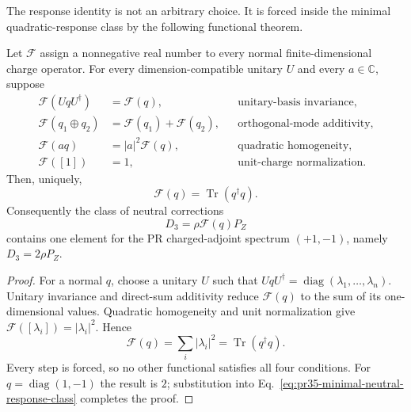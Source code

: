 The response identity is not an arbitrary choice.  It is forced inside the minimal quadratic-response class by the following functional theorem.

\begin{theorem}
\label{thm:pr35-unique-quadratic-response}
Let $\mathcal F$ assign a nonnegative real number to every normal finite-dimensional charge operator.  For every dimension-compatible unitary $U$ and every $a\in\mathbb C$, suppose
\begin{align}
 \mathcal F(UqU^\dagger)&=\mathcal F(q),
 &&\text{unitary-basis invariance},\nonumber\\
 \mathcal F(q_1\oplus q_2)&=\mathcal F(q_1)+\mathcal F(q_2),
 &&\text{orthogonal-mode additivity},\nonumber\\
 \mathcal F(aq)&=|a|^2\mathcal F(q),
 &&\text{quadratic homogeneity},\nonumber\\
 \mathcal F([1])&=1,
 &&\text{unit-charge normalization}.
 \label{eq:pr35-canonical-response-axioms}
\end{align}
Then, uniquely,
\begin{equation}
 \mathcal F(q)=\operatorname{Tr}(q^\dagger q).
 \label{eq:pr35-unique-response-functional}
\end{equation}
Consequently the class of neutral corrections
\begin{equation}
 D_3=\rho\mathcal F(q)P_Z
 \label{eq:pr35-minimal-neutral-response-class}
\end{equation}
contains one element for the PR charged-adjoint spectrum $(+1,-1)$, namely
$D_3=2\rho P_Z$.
\end{theorem}

\begin{proof}
For a normal $q$, choose a unitary $U$ such that $UqU^\dagger=\operatorname{diag}(\lambda_1,\ldots,\lambda_n)$.  Unitary invariance and direct-sum additivity reduce $\mathcal F(q)$ to the sum of its one-dimensional values.  Quadratic homogeneity and unit normalization give
$\mathcal F([\lambda_i])=|\lambda_i|^2$.  Hence
\begin{equation}
 \mathcal F(q)=\sum_i|\lambda_i|^2
 =\operatorname{Tr}(q^\dagger q).
\end{equation}
Every step is forced, so no other functional satisfies all four conditions. For $q=\operatorname{diag}(1,-1)$ the result is $2$; substitution into Eq.~\eqref{eq:pr35-minimal-neutral-response-class} completes the proof.
\end{proof}

